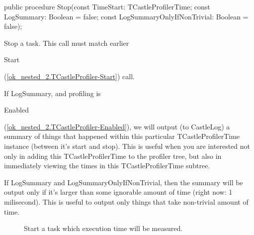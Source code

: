 \documentclass{report}
\begin{document}
\begin{list}{}{
\setlength{\itemindent}{0cm}
\setlength{\listparindent}{0cm}
\setlength{\leftmargin}{\evensidemargin}
\addtolength{\leftmargin}{\tmplength}
\settowidth{\labelsep}{X}
\addtolength{\leftmargin}{\labelsep}
\setlength{\labelwidth}{\tmplength}
}
\begin{flushleft}
\item[\textbf{Declaration}\hfill]
\begin{ttfamily}
public procedure Stop(const TimeStart: TCastleProfilerTime; const LogSummary: Boolean = false; const LogSummaryOnlyIfNonTrivial: Boolean = false);\end{ttfamily}


\end{flushleft}
\par
\item[\textbf{Description}]
Stop a task. This call must match earlier \begin{ttfamily}Start\end{ttfamily}(\ref{ok_nested_2.TCastleProfiler-Start}) call.

If LogSummary, and profiling is \begin{ttfamily}Enabled\end{ttfamily}(\ref{ok_nested_2.TCastleProfiler-Enabled}), we will output (to CastleLog) a summary of things that happened within this particular TCastleProfilerTime instance (between it's start and stop). This is useful when you are interested not only in adding this TCastleProfilerTime to the profiler tree, but also in immediately viewing the times in this TCastleProfilerTime subtree.

If LogSummary and LogSummaryOnlyIfNonTrivial, then the summary will be output only if it's larger than some ignorable amount of time (right now: 1 milisecond). This is useful to output only things that take non{-}trivial amount of time.

\item[\textbf{See also}]
\begin{description}
\item[\begin{ttfamily}Start\end{ttfamily}(\ref{ok_nested_2.TCastleProfiler-Start})] 
Start a task which execution time will be measured.
\end{description}


\end{list}
\end{document}
